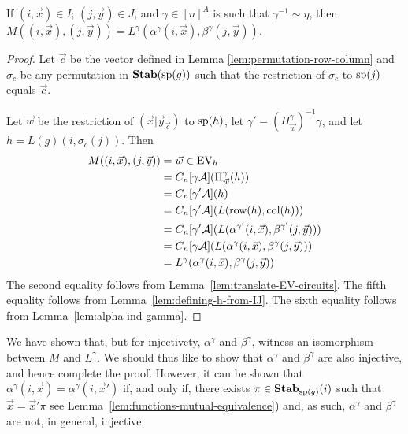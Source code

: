 \documentclass[../main/thesis.tex]{subfiles}
\begin{document}
\begin{thm}
  If $(i, \vec{x})\in I$; $(j, \vec{y})\in J$, and $\gamma\in
  [n]^{\underline{A}}$ is such that $ \gamma^{-1} \sim \eta$, then
  $M((i,\vec{x}), (j, \vec{y})) = L^{\gamma}(\alpha^{\gamma}(i, \vec{x}),
  \beta^{\gamma}(j, \vec{y}))$.
	\label{lem:ML-equal-elements}
\end{thm}
\begin{proof}
	Let $\vec{c}$ be the vector defined in Lemma \ref{lem:permutation-row-column}
  and $\sigma_c$ be any permutation in $\text{\textbf{Stab}} (\text{sp} (g))$ such that the restriction of
  $\sigma_c$ to $\text{sp}(j)$ equals $\vec{c}$.
  
  Let $\vec{w}$ be the restriction of $(\vec{x} \vert \vec{y}_{\vec{c}})$ to
  $\text{sp}(h)$, let $\gamma' = (\Pi^{\gamma}_{\vec{w}})^{-1} \gamma$, and let $h
  = L(g)(i, \sigma_c(j))$. Then
	\begin{align*}
		M((i, \vec{x}), (j, \vec{y}))
    & = \vec{w} \in \text{EV}_h                                    \\
    & = C_n[\gamma \mathcal{A}] (\Pi^{\gamma}_{\vec{w}} (h)) \\
    & = C_n[\gamma' \mathcal{A}] (h)                                                             \\
    & = C_n[\gamma' \mathcal{A}](L(\text{row}(h), \text{col} (h)))                                        \\
    & = C_n[\gamma' \mathcal{A}](L(\alpha^{\gamma'}(i, \vec{x}), \beta^{\gamma'}(j, \vec{y})))   \\
    & = C_n[\gamma \mathcal{A}](L(\alpha^{\gamma}(i, \vec{x}), \beta^{\gamma}(j, \vec{y})))     \\
    & = L^{\gamma}(\alpha^{\gamma}(i, \vec{x}), \beta^{\gamma}(j, \vec{y}))                      
	\end{align*}
	The second equality follows from Lemma~\ref{lem:translate-EV-circuits}. The
  fifth equality follows from Lemma~\ref{lem:defining-h-from-IJ}. The sixth
  equality follows from Lemma~\ref{lem:alpha-ind-gamma}.
\end{proof}

We have shown that, but for injectivety, $\alpha^{\gamma}$ and $\beta^{\gamma}$,
witness an isomorphism between $M$ and $L^{\gamma}$. We should thus like to show
that $\alpha^{\gamma}$ and $\beta^{\gamma}$ are also injective, and hence
complete the proof. However, it can be shown that $\alpha^{\gamma}(i, \vec{x}) =
\alpha^{\gamma}(i, \vec{x}')$ if, and only if, there exists $\pi \in
\text{\textbf{Stab}}_{\text{sp}(g)}(i)$ such that $\vec{x} = \vec{x}'\pi$ see
Lemma~\ref{lem:functions-mutual-equivalence}) and, as such, $\alpha^{\gamma}$
and $\beta^{\gamma}$ are not, in general, injective.
\end{document}
